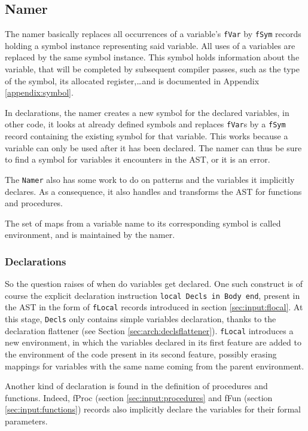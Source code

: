 \documentclass[a4paper]{memoir}
\begin{document}
\subsection{Namer}\label{sec:arch:namer}
The namer  basically replaces all occurrences of a variable's \lstinline!fVar! by \lstinline!fSym! records holding a symbol instance representing said variable. All uses of a variables are replaced by the same symbol instance. This symbol holds information about the variable, that will be completed by subsequent compiler passes, such as the type of the symbol, its allocated register,\ldots and is documented in Appendix \ref{appendix:symbol}.

In declarations, the namer creates a new symbol for the declared variables, in other code, it looks at already defined symbols and replaces \lstinline!fVar!s by a \lstinline!fSym! record containing the existing symbol for that variable. This works because a variable can only be used after it has been declared. The namer can thus be sure to find a symbol for variables it encounters in the AST, or it is an error.

The \lstinline!Namer! also has some work to do on patterns and the variables it
implicitly declares. As a consequence, it also handles and transforms the AST
for functions and procedures.

The set of maps from a variable name to its corresponding symbol is called environment, and is maintained by the namer.


\subsubsection{Declarations}
So the question raises of when do variables get declared.
One such construct is of course the explicit declaration instruction \lstinline!local Decls in Body end!, present in the AST in the form of \lstinline!fLocal! records introduced in section \ref{sec:input:flocal}. At this stage, \lstinline!Decls! only contains simple variables declaration, thanks to the declaration flattener (see Section \ref{sec:arch:declsflattener}). \lstinline!fLocal! introduces a new environment, in which the variables declared in its first feature are added to the environment of the code present in its second feature, possibly erasing mappings for variables with the same name coming from the parent environment. 

Another kind of declaration is found in the definition of procedures and functions. Indeed, fProc (section \ref{sec:input:procedures} and fFun (section \ref{sec:input:functions}) records also implicitly declare the variables for their formal parameters. %
\end{document}
